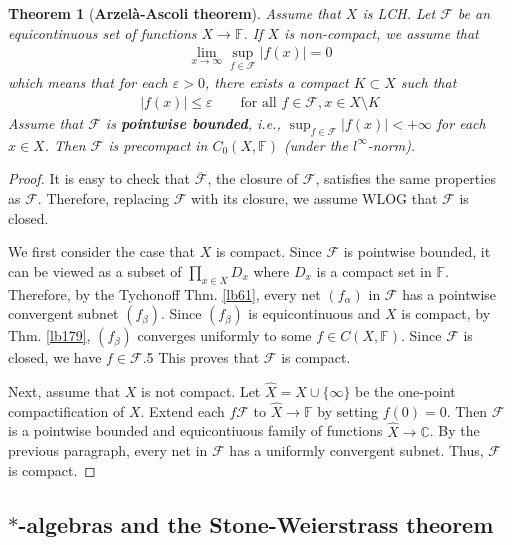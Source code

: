 \documentclass[12pt,b5paper,notitlepage]{article}
\theoremstyle{definition}
\theoremstyle{plain}
\newtheorem{thm}[df]{Theorem}
\newcommand{\wht}{\widehat}
\newcommand{\ovl}{\overline}
\newcommand{\scr}{\mathscr}
\newcommand{\Cbb}{\mathbb C}
\newcommand{\Fbb}{\mathbb F}
\newcommand{\eps}{\varepsilon}
\numberwithin{equation}{section}
\begin{document}
\begin{thm}[\textbf{Arzel\`a-Ascoli theorem}]
Assume that $X$ is LCH. Let $\scr F$ be an equicontinuous set of functions $X\rightarrow\Fbb$. If $X$ is non-compact, we assume that 
\begin{align}
\lim_{x\rightarrow\infty}\sup_{f\in\scr F}|f(x)|=0
\end{align}
which means that for each $\eps>0$, there exists a compact $K\subset X$ such that
\begin{align*}
|f(x)|\leq\eps\qquad\text{for all }f\in\scr F,x\in X\setminus K
\end{align*}
Assume that $\scr F$ is \textbf{pointwise bounded}, i.e., $\sup_{f\in\scr F}|f(x)|<+\infty$ for each $x\in X$. Then $\scr F$ is precompact in $C_0(X,\Fbb)$ (under the $l^\infty$-norm).
\end{thm}


\begin{proof}
It is easy to check that $\ovl{\scr F}$, the closure of $\scr F$, satisfies the same properties as $\scr F$. Therefore, replacing $\scr F$ with its closure, we assume WLOG that $\scr F$ is closed. 

We first consider the case that $X$ is compact. Since $\scr F$ is pointwise bounded, it can be viewed as a subset of $\prod_{x\in X}D_x$ where $D_x$ is a compact set in $\Fbb$. Therefore, by the Tychonoff Thm. \ref{lb61}, every net $(f_\alpha)$ in $\scr F$ has a pointwise convergent subnet $(f_\beta)$. Since $(f_\beta)$ is equicontinuous and $X$ is compact, by Thm. \ref{lb179}, $(f_\beta)$ converges uniformly to some $f\in C(X,\Fbb)$. Since $\scr F$ is closed, we have $f\in\scr F$.5 This proves that $\scr F$ is compact.

Next, assume that $X$ is not compact. Let $\wht X=X\cup\{\infty\}$ be the one-point compactification of $X$. Extend each $f\scr F$ to $\wht X\rightarrow\Fbb$ by setting $f(0)=0$. Then $\scr F$ is a pointwise bounded and equicontiuous family of functions $\wht X\rightarrow\Cbb$. By the previous paragraph, every net in $\scr F$ has a uniformly convergent subnet. Thus, $\scr F$ is compact.
\end{proof}







\subsection{$*$-algebras and the Stone-Weierstrass theorem}
\end{document}
